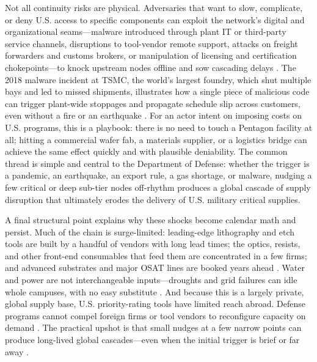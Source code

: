Not all continuity risks are physical. Adversaries that want to slow, complicate, or deny U.S. access to specific components can exploit the network's digital and organizational seams---malware introduced through plant IT or third-party service channels, disruptions to tool-vendor remote support, attacks on freight forwarders and customs brokers, or manipulation of licensing and certification chokepoints---to knock upstream nodes offline and sow cascading delays \parencite{ch5_dod2022_supplychains,wasser_when_2022}. The 2018 malware incident at TSMC, the world's largest foundry, which shut multiple bays and led to missed shipments, illustrates how a single piece of malicious code can trigger plant-wide stoppages and propagate schedule slip across customers, even without a fire or an earthquake \parencite{tsmc_tsmc_2018}. For an actor intent on imposing costs on U.S. programs, this is a playbook: there is no need to touch a Pentagon facility at all; hitting a commercial wafer fab, a materials supplier, or a logistics bridge can achieve the same effect quickly and with plausible deniability. The common thread is simple and central to the Department of Defense: whether the trigger is a pandemic, an earthquake, an export rule, a gas shortage, or malware, nudging a few critical or deep sub-tier nodes off-rhythm produces a global cascade of supply disruption that ultimately erodes the delivery of U.S. military critical supplies.

A final structural point explains why these shocks become calendar math and persist. Much of the chain is surge-limited: leading-edge lithography and etch tools are built by a handful of vendors with long lead times; the optics, resists, and other front-end consumables that feed them are concentrated in a few firms; and advanced substrates and major OSAT lines are booked years ahead \parencite{thadani_mapping_2023}. Water and power are not interchangeable inputs---droughts and grid failures can idle whole campuses, with no easy substitute \parencite{lepawsky_climate_2024}. And because this is a largely private, global supply base, U.S. priority-rating tools have limited reach abroad. Defense programs cannot compel foreign firms or tool vendors to reconfigure capacity on demand \parencite{ch5_dod2022_supplychains,department_of_defense_assured_2025}. The practical upshot is that small nudges at a few narrow points can produce long-lived global cascades---even when the initial trigger is brief or far away \parencite{usdoe_office_of_energy_efficiency_and_renewable_energy_eere_semiconductor_2022}.

